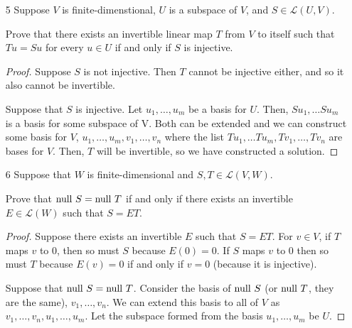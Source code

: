\begin{enumerate}
\begin{proof}
        Suppose that $T$ is injective. This implies surjectivity, so each $w \in V$ has some unique $u \in V$ such that $Tu = w$. Given some basis of $V$, $v_1, \dots, v_n$, $Tv_i$ forms a basis since there is a unique linear combination for all elements of $V$, the definition of a basis.

        Notice I did not mention any particular basis, which means it works for any and all bases.
    \end{proof}
    

    \item[5] Suppose $V$ is finite-dimenstional, $U$ is a subspace of $V$, and $S \in \mathcal L(U, V)$. 
    
    Prove that there exists an invertible linear map $T$ from $V$ to itself such that $Tu = Su$ for every $u \in U$ if and only if $S$ is injective.

    \begin{proof}
        Suppose $S$ is not injective. Then $T$ cannot be injective either, and so it also cannot be invertible.

        Suppose that $S$ is injective. Let $u_1, \dots, u_m$ be a basis for $U$. Then, $Su_1, \dots Su_m$ is a basis for some subspace of V. Both can be extended and we can construct some basis for $V$, $u_1, \dots, u_m, v_1, \dots, v_n$ where the list $Tu_1, \dots Tu_m, Tv_1, \dots, Tv_n$ are bases for $V$. Then, $T$ will be invertible, so we have constructed a solution.
    \end{proof}


    \item[6] Suppose that $W$ is finite-dimensional and $S, T \in \mathcal L(V, W)$.
    
    Prove that $\text{null } S = \text{null } T$ if and only if there exists an invertible $E \in \mathcal L(W)$ such that $S = ET$.

    \begin{proof}
        Suppose there exists an invertible $E$ such that $S = ET$. For $v \in V$, if $T$ maps $v$ to 0, then so must $S$ because $E(0) = 0$. If $S$ maps $v$ to 0 then so must $T$ because $E(v) = 0$ if and only if $v = 0$ (because it is injective).


        Suppose that $\text{null } S = \text{null } T$. Consider the basis of $\text{null } S$ (or $\text{null } T$, they are the same), $v_1, \dots, v_n$. We can extend this basis to all of $V$ as $v_1, \dots, v_n, u_1, \dots, u_m$. Let the subspace formed from the basis $u_1, \dots, u_m$ be $U$. 
        

\end{proof}
\end{enumerate}
